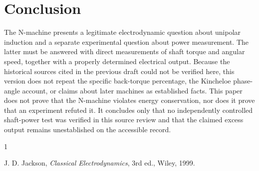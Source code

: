 \documentclass[11pt]{article}
\begin{document}
\section{Conclusion}

The N-machine presents a legitimate electrodynamic question about unipolar induction and a separate experimental question about power measurement. The latter must be answered with direct measurements of shaft torque and angular speed, together with a properly determined electrical output. Because the historical sources cited in the previous draft could not be verified here, this version does not repeat the specific back-torque percentage, the Kincheloe phase-angle account, or claims about later machines as established facts. This paper does not prove that the N-machine violates energy conservation, nor does it prove that an experiment refuted it. It concludes only that no independently controlled shaft-power test was verified in this source review and that the claimed excess output remains unestablished on the accessible record.

\begin{thebibliography}{1}

 J. D. Jackson, \emph{Classical Electrodynamics}, 3rd ed., Wiley, 1999.

\end{thebibliography}
\end{document}
